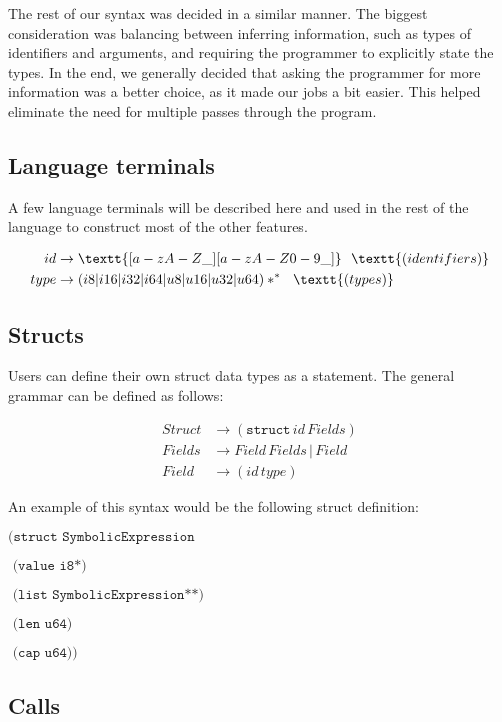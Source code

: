 \documentclass[journal=jacsat, manuscript=article]{achemso}
\begin{document}
The rest of our syntax was decided in a similar manner. The biggest consideration was balancing between inferring information, such as types of identifiers and arguments, and requiring the programmer to explicitly state the types. In the end, we generally decided that asking the programmer for more information was a better choice, as it made our jobs a bit easier. This helped eliminate the need for multiple passes through the program.

\subsection{Language terminals}

A few language terminals will be described here and used in the rest of the
language to construct most of the other features.

\begin{align}
    id &\rightarrow \textt{[a-zA-Z\_][a-zA-Z0-9\_]}\,\,\,\,\textt{(identifiers)}\\
    type &\rightarrow (i8|i16|i32|i64|u8|u16|u32|u64)*^*\,\,\,\,\textt{(types)} \\
\end{align}

\subsection{Structs}

Users can define their own struct data types as a statement. The general
grammar can be defined as follows:

\begin{align}
Struct &\rightarrow (\texttt{struct}\,id\,Fields) \\
Fields &\rightarrow Field\,Fields\,|\,Field \\
Field  &\rightarrow (id\,type)
\end{align}

An example of this syntax would be the following struct definition:

$\texttt{(struct SymbolicExpression}$

$\texttt{  (value i8*)}$

$\texttt{  (list SymbolicExpression**)}$

$\texttt{  (len u64)}$

$\texttt{  (cap u64))}$

\subsection{Calls}
\end{document}
